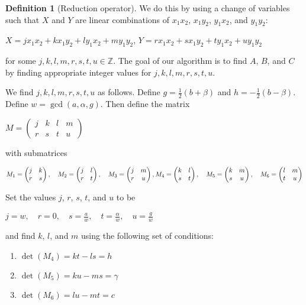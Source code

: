 \documentclass{article}
\theoremstyle{definition}
\newtheorem{definition}{Definition}[section]
\theoremstyle{theorem}
\theoremstyle{example}
\theoremstyle{corollary}
\begin{document}
\begin{definition}[Reduction operator]
\bigskip

We do this by using a change of variables such that \(X\) and \(Y\) are linear combinations of \(x_{1} x_{2}\), \(x_{1} y_{2}\), \(y_{1} x_{2}\), and \(y_{1} y_{2}\):
\begin{center}
\(X = j x_{1} x_{2} + k x_{1} y_{2} + l y_{1} x_{2} + m y_{1} y_{2}\), \quad \(Y = r x_{1} x_{2} + s x_{1} y_{2} + t y_{1} x_{2} + u y_{1} y_{2}\)
\end{center}
for some \(j, k, l, m, r, s, t, u \in \mathbb{Z}\). The goal of our algorithm is to find \(A\), \(B\), and \(C\) by finding appropriate integer values for \(j, k, l, m, r, s, t, u\).

\bigskip

We find \(j, k, l, m, r, s, t, u\) as follows. Define \(g = \frac{1}{2} (b + \beta)\) and \(h = - \frac{1}{2} (b - \beta)\). Define \(w = \gcd(a, \alpha, g)\). Then define the matrix
\begin{center}
\(M = \begin{pmatrix} j & k & l & m \\ r & s & t & u \end{pmatrix}\)
\end{center}
with submatrices
\begin{center}
\(M_{1} = \begin{pmatrix} j & k \\ r & s \end{pmatrix}, \quad M_{2} = \begin{pmatrix} j & l \\ r & t \end{pmatrix}, \quad M_{3} = \begin{pmatrix} j & m \\ r & u \end{pmatrix}, \\
\bigskip
M_{4} = \begin{pmatrix} k & l \\ s & t \end{pmatrix}, \quad M_{5} = \begin{pmatrix} k & m \\ s & u \end{pmatrix}, \quad M_{6} = \begin{pmatrix} l & m \\ t & u \end{pmatrix}\)
\end{center}

\bigskip

Set the values \(j\), \(r\), \(s\), \(t\), and \(u\) to be
\begin{center}
\(j = w, \quad r = 0, \quad s = \frac{a}{w}, \quad t = \frac{\alpha}{w}, \quad u = \frac{g}{w}\)
\end{center}
and find \(k\), \(l\), and \(m\) using the following set of conditions:
\begin{enumerate}
\item \(\det(M_{4}) = k t - l s = h\)
\item \(\det(M_{5}) = k u - ms = \gamma\)
\item \(\det(M_{6}) = l u - m t = c\)  
\end{enumerate}


\end{definition}
\end{document}
